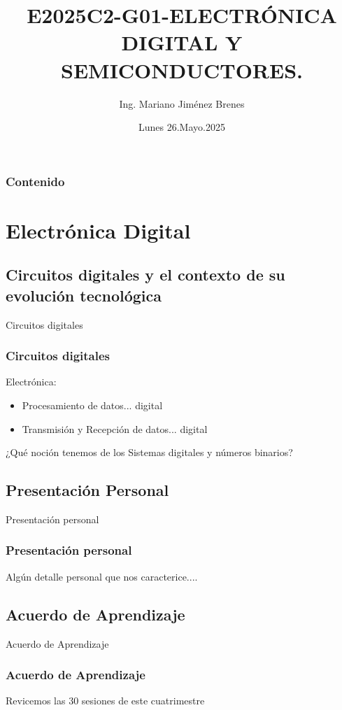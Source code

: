 \documentclass[11pt]{beamer}
\author{Ing. Mariano Jim\'enez Brenes}
\title
{
E2025C2-G01-ELECTRÓNICA DIGITAL Y SEMICONDUCTORES.
}
\institute{
Universidad Castro Carazo\linebreak
T\'ecnico En Semiconductores
}
\date{Lunes 26.Mayo.2025}
\begin{document}
\begin{frame}
\maketitle 
\end{frame}

\logo{}

\begin{frame}
\frametitle{Contenido}
\tableofcontents
\end{frame}


\section{Electr\'onica Digital}
\subsection{Circuitos digitales y el
contexto de su evoluci\'on
tecnol\'ogica}
\begin{frame}{Circuitos digitales}
\frametitle{Circuitos digitales}
Electr\'onica:
	\begin{itemize}
		\item Procesamiento de datos... digital
		\item Transmisi\'on y Recepci\'on de datos... digital
	\end{itemize}
	¿Qu\'e noci\'on tenemos de los Sistemas digitales y n\'umeros binarios?
\end{frame}
\subsection{Presentaci\'on Personal}
\begin{frame}{Presentaci\'on personal}
\frametitle{Presentaci\'on personal}
Alg\'un detalle personal que nos caracterice....
\end{frame}
\subsection{Acuerdo de Aprendizaje}
\begin{frame}{Acuerdo de Aprendizaje}
\frametitle{Acuerdo de Aprendizaje}
Revicemos las 30 sesiones de este cuatrimestre
\end{frame}
\end{document}
